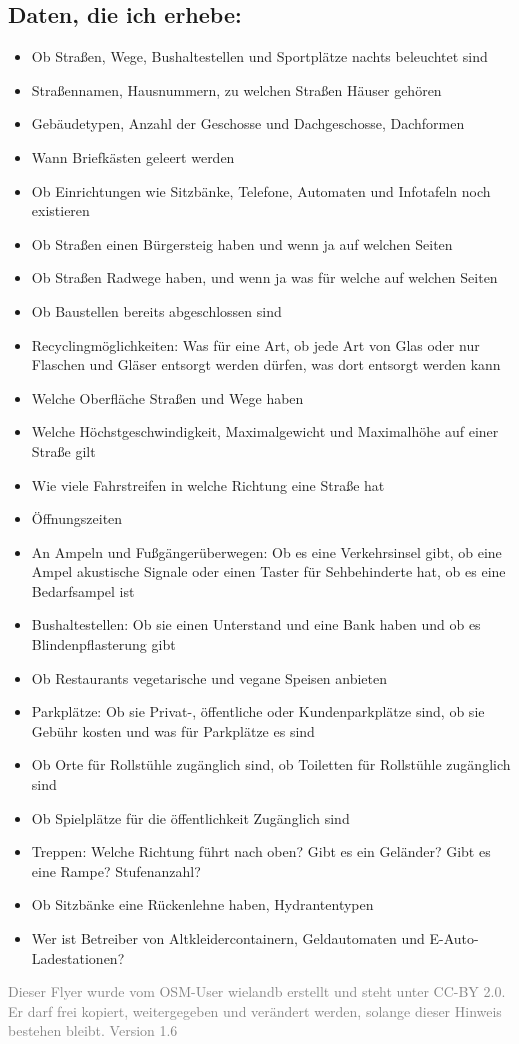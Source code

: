\documentclass[10pt,foldmark,notumble]{leaflet}
\begin{document}
    \subsection{Daten, die ich erhebe:}
    \begin{itemize}[noitemsep,topsep=0pt]
        \item Ob Straßen, Wege, Bushaltestellen und Sportplätze nachts beleuchtet sind
        \item Straßennamen, Hausnummern, zu welchen Straßen Häuser gehören
        \item Gebäudetypen, Anzahl der Geschosse und Dachgeschosse, Dachformen
        \item Wann Briefkästen geleert werden
        \item Ob Einrichtungen wie Sitzbänke, Telefone, Automaten und Infotafeln noch existieren
        \item Ob Straßen einen Bürgersteig haben und wenn ja auf welchen Seiten
        \item Ob Straßen Radwege haben, und wenn ja was für welche auf welchen Seiten
        \item Ob Baustellen bereits abgeschlossen sind
        \item Recyclingmöglichkeiten: Was für eine Art, ob jede Art von Glas oder nur Flaschen und Gläser entsorgt werden dürfen, was dort entsorgt werden kann
        \item Welche Oberfläche Straßen und Wege haben
        \item Welche Höchstgeschwindigkeit, Maximalgewicht und Maximalhöhe auf einer Straße gilt
        \item Wie viele Fahrstreifen in welche Richtung eine Straße hat
        \item Öffnungszeiten
        \item An Ampeln und Fußgängerüberwegen: Ob es eine Verkehrsinsel gibt, ob eine Ampel akustische Signale oder einen Taster für Sehbehinderte hat, ob es eine Bedarfsampel ist
        \item Bushaltestellen: Ob sie einen Unterstand und eine Bank haben und ob es Blindenpflasterung gibt
        \item Ob Restaurants vegetarische und vegane Speisen anbieten
        \item Parkplätze: Ob sie Privat-, öffentliche oder Kundenparkplätze sind, ob sie Gebühr kosten und was für Parkplätze es sind
        \item Ob Orte für Rollstühle zugänglich sind, ob Toiletten für Rollstühle zugänglich sind
        \item Ob Spielplätze für die öffentlichkeit Zugänglich sind
        \item Treppen: Welche Richtung führt nach oben? Gibt es ein Geländer? Gibt es eine Rampe? Stufenanzahl?
        \item Ob Sitzbänke eine Rückenlehne haben, Hydrantentypen
        \item Wer ist Betreiber von Altkleidercontainern, Geldautomaten und E-Auto-Ladestationen?
    \end{itemize}


    \vfill
    \textcolor{gray}{\small Dieser Flyer wurde vom OSM-User wielandb erstellt und steht unter CC-BY 2.0. Er darf frei kopiert, weitergegeben und verändert werden, solange dieser Hinweis bestehen bleibt. Version 1.6}
\end{document}
